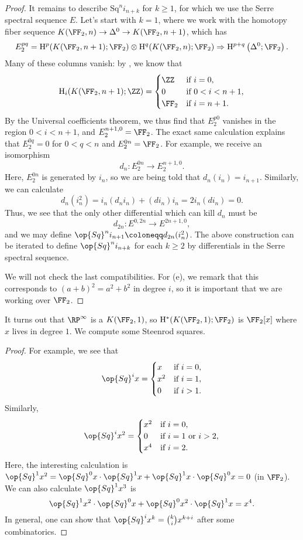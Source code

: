 \documentclass[../notes.tex]{subfiles}
\begin{document}
\begin{proof}
	It remains to describe $\mathrm{Sq}^ni_{n+k}$ for $k\ge1$, for which we use the Serre spectral sequence $E$. Let's start with $k=1$, where we work with the homotopy fiber sequence $K(\FF_2,n)\to\Delta^0\to K(\FF_2,n+1)$, which has
	\[E_2^{pq}=\mathrm H^p(K(\FF_2,n+1);\FF_2)\otimes\mathrm H^q(K(\FF_2,n);\FF_2)\Rightarrow\mathrm H^{p+q}\left(\Delta^0;\FF_2\right).\]
	Many of these columns vanish: by , we know that
	\[\mathrm H_i(K(\FF_2,n+1);\ZZ)=\begin{cases}
		\ZZ & \text{if }i=0, \\
		0 & \text{if }0<i<n+1, \\
		\FF_2 & \text{if }i=n+1.
	\end{cases}\]
	By the Universal coefficients theorem, we thus find that $E_2^{p0}$ vanishes in the region $0<i<n+1$, and $E_2^{n+1,0}=\FF_2$. The exact same calculation explains that $E_2^{0q}=0$ for $0<q<n$ and $E_2^{0n}=\FF_2$. For example, we receive an isomorphism
	\[d_n\colon E_2^{0n}\to E_2^{n+1,0}.\]
	Here, $E_2^{0n}$ is generated by $i_n$, so we are being told that $d_n(i_n)=i_{n+1}$. Similarly, we can calculate
	\[d_n\left(i_n^2\right)=i_n(d_ni_n)+(di_n)i_n=2i_n(di_n)=0.\]
	Thus, we see that the only other differential which can kill $d_n$ must be
	\[d_{2n}\colon E^{0,2n}\to E^{2n+1,0},\]
	and we may define $\op{Sq}^ni_{n+1}\coloneqq d_{2n}(i_n^2)$. The above construction can be iterated to define $\op{Sq}^ni_{n+k}$ for each $k\ge2$ by differentials in the Serre spectral sequence.
	
	We will not check the last compatibilities. For (e), we remark that this corresponds to $(a+b)^2=a^2+b^2$ in degree $i$, so it is important that we are working over $\FF_2$.
\end{proof}
\begin{example} \label{ex:cohom-k-1}
	It turns out that $\RP^\infty$ is a $K(\FF_2,1)$, so $\mathrm H^*(K(\FF_2,1);\FF_2)$ is $\FF_2[x]$ where $x$ lives in degree $1$. We compute some Steenrod squares.
\end{example}
\begin{proof}
	For example, we see that
	\[\op{Sq}^ix=\begin{cases}
		x & \text{if }i=0, \\
		x^2 & \text{if }i=1, \\
		0 & \text{if }i>1.
	\end{cases}\]
	Similarly,
	\[\op{Sq}^ix^2=\begin{cases}
		x^2 & \text{if }i=0, \\
		0 & \text{if }i=1\text{ or }i>2, \\
		x^4 & \text{if }i=2.
	\end{cases}\]
	Here, the interesting calculation is $\op{Sq}^1x^2=\op{Sq}^0x\cdot\op{Sq}^1x+\op{Sq}^1x\cdot\op{Sq}^0x=0$ (in $\FF_2$). We can also calculate $\op{Sq}^1x^3$ is
	\[\op{Sq}^1x^2\cdot\op{Sq}^0x+\op{Sq}^0x^2\cdot\op{Sq}^1x=x^4.\]
	In general, one can show that $\op{Sq}^ix^k=\binom kix^{k+i}$ after some combinatorics.
\end{proof}
\end{document}
